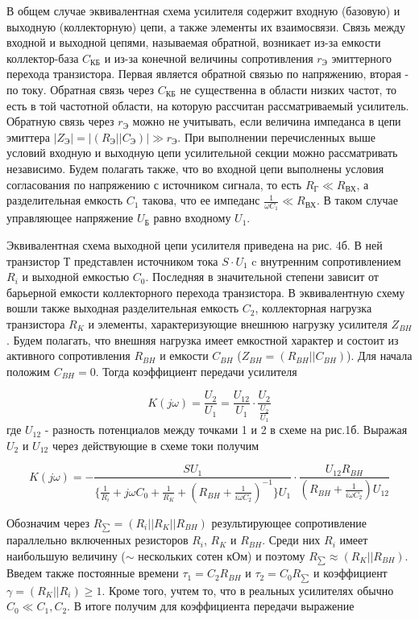 В общем случае эквивалентная схема усилителя содержит входную (базовую) и выходную (коллекторную) цепи, а также элементы их взаимосвязи. Связь между входной и выходной цепями, называемая обратной, возникает из-за емкости коллектор-база $C_{\text{КБ}}$ и из-за конечной величины сопротивления $r_{\text{Э}}$ эмиттерного перехода транзистора. Первая является обратной связью по напряжению, вторая - по току. Обратная связь через $C_{\text{КБ}}$ не существенна в области низких частот, то есть в той частотной области, на которую рассчитан рассматриваемый усилитель. Обратную связь через $r_{\text{Э}}$ можно не учитывать, если величина импеданса в цепи эмиттера $|Z_{\text{Э}}|=| (R_{\text{Э}}||C_{\text{Э}})|\gg r_{\text{Э}}$. При выполнении перечисленных выше условий входную и выходную цепи усилительной секции можно рассматривать независимо. Будем полагать также, что во входной цепи выполнены условия согласования по напряжению с источником сигнала, то есть $R_{\text{Г}} \ll R_{\text{ВХ}}$, а разделительная емкость $C_1$ такова, что ее импеданс $\frac{1}{\omega C_1} \ll R_{\text{ВХ}}$. В таком случае управляющее напряжение $U_{\text{Б}}$ равно входному $U_1$.

Эквивалентная схема выходной цепи усилителя приведена на рис. 4б. В ней транзистор Т представлен источником тока $S\cdot U_1$ c внутренним сопротивлением $R_i$ и выходной емкостью $C_0$. Последняя в значительной степени зависит от барьерной емкости коллекторного перехода транзистора. В эквивалентную схему вошли также выходная разделительная емкость $C_2$, коллекторная нагрузка транзистора $R_K$ и элементы, характеризующие внешнюю нагрузку усилителя $Z_{BH}$. Будем полагать, что внешняя нагрузка имеет емкостной характер и состоит из активного сопротивления $R_{BH}$ и емкости $C_{BH}$ ($Z_{BH}=(R_{BH}||C_{BH})$). Для начала положим $C_{BH}=0$. Тогда коэффициент передачи усилителя

$$K(j\omega)=\frac{U_2}{U_1}=\frac{U_{12}}{U_1} \cdot \frac{U_2}{\frac{U_2}{U_1}}$$
где $U_{12}$ - разность потенциалов между точками 1 и 2 в схеме на рис.1б. Выражая $U_2$ и $U_{12}$ через действующие в схеме токи получим

$$K(j\omega)=-\frac{SU_1}{\{\frac{1}{R_i}+j\omega C_0+\frac{1}{R_K}+(R_{BH}+\frac{1}{i\omega C_2})^{-1}\}U_1} \cdot \frac{U_{12}R_{BH}}{(R_{BH}+\frac{1}{i\omega C_2})U_{12}}$$

Обозначим через $R_{\sum}=(R_i||R_K||R_{BH})$ результирующее сопротивление параллельно включенных резисторов $R_i$, $R_K$ и $R_{BH}$. Среди них $R_i$ имеет наибольшую величину ($\sim$ нескольких сотен кОм) и поэтому $R_{\sum} \approx (R_K||R_{BH})$. Введем также постоянные времени $\tau_1=C_2 R_{BH}$ и $\tau_2=C_0 R_{\sum}$ и коэффициент $\gamma=(R_K||R_i)\geq 1$. Кроме того, учтем то, что в реальных усилителях обычно $C_0 \ll C_1,C_2$. В итоге получим для коэффициента передачи выражение

